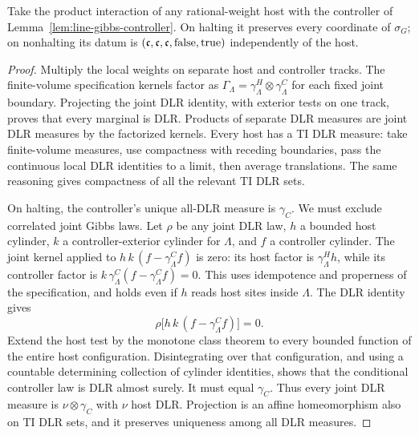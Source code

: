 \begin{lemma}\label{lem:line-gibbs-host}
Take the product interaction of any rational-weight host with the
controller of Lemma~\ref{lem:line-gibbs-controller}. On halting it
preserves every coordinate of $\sigma_G$; on nonhalting its datum is
$(\mathfrak c,\mathfrak c,\mathfrak c,\mathrm{false},\mathrm{true})$ independently of
the host.
\end{lemma}
\begin{proof}
Multiply the local weights on separate host and controller tracks.
The finite-volume specification kernels factor as
$\Gamma_\Lambda=\gamma^H_\Lambda\otimes\gamma^C_\Lambda$ for each
fixed joint boundary. Projecting the joint DLR identity, with
exterior tests on one track, proves that every marginal is DLR.
Products of separate DLR measures are joint DLR measures by the
factorized kernels. Every host has a TI DLR measure: take finite-volume
measures, use compactness with receding boundaries, pass the continuous
local DLR identities to a limit, then average translations. The
same reasoning gives compactness of all the relevant TI DLR sets.

On halting, the controller's unique all-DLR measure is $\gamma_C$.
We must exclude correlated joint Gibbs laws. Let $\rho$ be any
joint DLR law, $h$ a bounded host cylinder, $k$ a controller-exterior
cylinder for $\Lambda$, and $f$ a controller cylinder. The joint
kernel applied to
$h\,k\,(f-\gamma^C_\Lambda f)$ is zero: its host factor is
$\gamma^H_\Lambda h$, while its controller factor is
$k\,\gamma^C_\Lambda(f-\gamma^C_\Lambda f)=0$.
This uses idempotence and properness of the specification, and holds
even if $h$ reads host sites inside $\Lambda$.
The DLR identity gives
\[
 \rho\bigl[h\,k\,(f-\gamma^C_\Lambda f)\bigr]=0.
\]
Extend the host test by the monotone class theorem to every bounded
function of the entire host configuration. Disintegrating over that
configuration, and using a countable determining collection of
cylinder identities, shows that the conditional controller law is
DLR almost surely. It must equal $\gamma_C$. Thus every joint DLR
measure is $\nu\otimes\gamma_C$ with $\nu$ host DLR. Projection is an
affine homeomorphism also on TI DLR sets, and it preserves uniqueness
among all DLR measures.


\end{proof}
